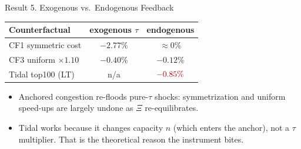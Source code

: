 \documentclass[11pt,aspectratio=169]{beamer}
\newcommand{\good}[1]{\textcolor{blue!70!black}{#1}}
\newcommand{\bad}[1]{\textcolor{red!70!black}{#1}}
\newcommand{\app}[1]{\hyperlink{#1}{\beamergotobutton{details}}}
\begin{document}
\begin{frame}{Result 5. Exogenous vs.\ Endogenous Feedback}
\begin{center}\small
\begin{tabular}{lcc}
\toprule
Counterfactual & exogenous $\tau$ & endogenous \\
\midrule
CF1 symmetric cost & $-2.77\%$ & $\approx 0\%$ \\
CF3 uniform $\times1.10$ & $-0.40\%$ & $-0.12\%$ \\
Tidal top100 (LT) & n/a & $\bad{-0.85\%}$ \\
\bottomrule
\end{tabular}
\end{center}
\vspace{0.4em}
\begin{itemize}\small
  \item Anchored congestion \good{re-floods} pure-$\tau$ shocks: symmetrization and uniform speed-ups are largely undone as $\Xi$ re-equilibrates.
  \item \good{Tidal works because it changes capacity $n$} (which enters the anchor), not a $\tau$ multiplier. That is the theoretical reason the instrument bites. \app{appexog}
\end{itemize}
\end{frame}
\end{document}
